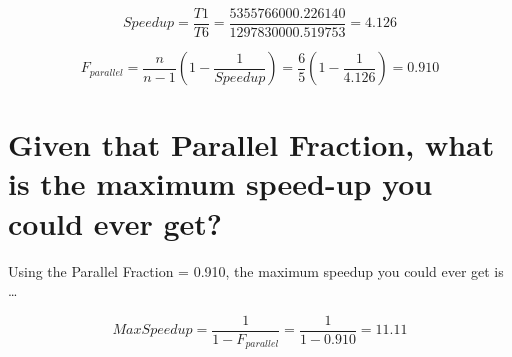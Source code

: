 \documentclass[onecolumn,draftclsnofoot, 10pt, compsoc]{IEEEtran}
\begin{document}
	\[Speedup = \frac{T1}{T6} = \frac{5355766000.226140}{1297830000.519753} =  4.126\]
	
	\[F_{parallel} = \frac{n}{n-1} (1 - \frac{1}{Speedup}) = \frac{6}{5} (1 - \frac{1}{4.126}) = 0.910\]
	
	
	
	
	\section{Given that Parallel Fraction, what is the maximum speed-up you could ever get?}
	Using the Parallel Fraction = 0.910, the maximum speedup you could ever get is \dots
	
	\[ Max Speedup = \frac{1}{1 - F_{parallel}} =  \frac{1}{1 - 0.910} = 11.11\]

	

	
	
\end{document}
